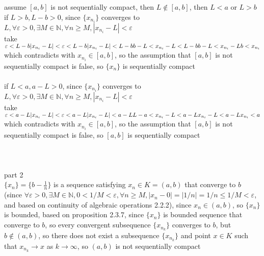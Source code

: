 \documentclass[12pt, border = 4pt, multi]{article} %
\begin{document}
assume $[a, b]$ is not sequentially compact, then $L \not\in [a, b]$, then $L < a$ or $L > b$\\
if $L > b, L - b > 0$, since $\{x_{n_i}\}$ converges to $L, \forall \varepsilon > 0, \exists M \in \mathbb{N}, \forall n \geq M, |x_{n_i} - L| < \varepsilon$\\
take $\varepsilon < L - b\\
|x_{n_i} - L| < \varepsilon < L - b\\
|x_{n_i} - L| < L - b\\
b - L < x_{n_i} - L < L - b\\
b - L < x_{n_i} - L\\
b < x_{n_i}$\\
which contradicts with $x_{n_i} \in [a, b]$, so the assumption that $[a, b]$ is not sequentially compact is false, so $\{x_n\}$ is sequentially compact\\
\\
if $L < a, a - L > 0$, since $\{x_{n_i}\}$ converges to $L, \forall \varepsilon > 0, \exists M \in \mathbb{N}, \forall n \geq M, |x_{n_i} - L| < \varepsilon$\\
take $\varepsilon < a - L\\
|x_{n_i} - L| < \varepsilon < a - L\\
|x_{n_i} - L| < a - L\\
L - a < x_{n_i} - L < a - L\\
x_{n_i} - L < a - L\\
x_{n_i} < a$\\
which contradicts with $x_{n_i} \in [a, b]$, so the assumption that $[a, b]$ is not sequentially compact is false, so $[a, b]$ is sequentially compact\\
\\
\\
\\
part 2\\
{\large$\{x_n\} = \{b - \frac{1}{n}\}$} is a sequence satisfying $x_n \in K = (a, b)$ that converge to $b$ (since $\forall \varepsilon > 0, \exists M \in \mathbb{N}, 0 < 1 / M < \varepsilon, \forall n \geq M, |x_n - 0| = |1 / n| = 1 / n \leq 1 / M < \varepsilon$, and based on continuity of algebraic operations 2.2.2), since $x_n \in (a, b)$, so $\{x_n\}$ is bounded, based on proposition 2.3.7, since $\{x_n\}$ is bounded sequence that converge to $b$, so every convergent subsequence $\{x_{n_k}\}$ converges to $b$, but $b \not\in (a, b)$, so there does not exist a subsequence $\{x_{n_k}\}$ and point $x \in K$ such that $x_{n_k} \rightarrow x$ as $k \rightarrow \infty$, so $(a, b)$ is not sequentially compact\\
\end{document}
